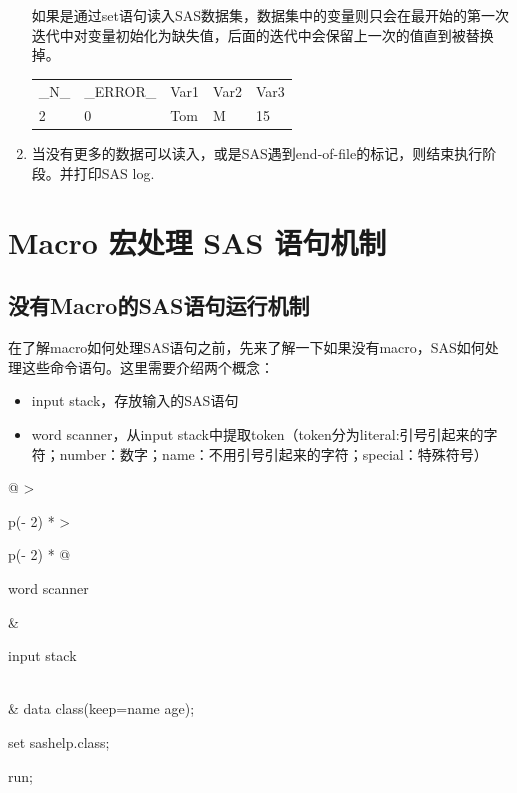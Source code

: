 \documentclass[
  letterpaper,
  DIV=11,
  numbers=noendperiod]{scrreprt}
\begin{document}
\begin{enumerate}
  如果是通过set语句读入SAS数据集，数据集中的变量则只会在最开始的第一次迭代中对变量初始化为缺失值，后面的迭代中会保留上一次的值直到被替换掉。

  \begin{longtable}[]{@{}lllll@{}}
  \toprule\noalign{}
  \endhead
  \bottomrule\noalign{}
  \endlastfoot
  \_N\_ & \_ERROR\_ & Var1 & Var2 & Var3 \\
  2 & 0 & Tom & M & 15 \\
  \end{longtable}
\item
  当没有更多的数据可以读入，或是SAS遇到end-of-file的标记，则结束执行阶段。并打印SAS
  log.
\end{enumerate}

\hypertarget{macro-ux5b8fux5904ux7406-sas-ux8bedux53e5ux673aux5236}{%
\chapter*{Macro 宏处理 SAS
语句机制}\label{macro-ux5b8fux5904ux7406-sas-ux8bedux53e5ux673aux5236}}


\hypertarget{ux6ca1ux6709macroux7684sasux8bedux53e5ux8fd0ux884cux673aux5236}{%
\section{没有Macro的SAS语句运行机制}\label{ux6ca1ux6709macroux7684sasux8bedux53e5ux8fd0ux884cux673aux5236}}

在了解macro如何处理SAS语句之前，先来了解一下如果没有macro，SAS如何处理这些命令语句。这里需要介绍两个概念：

\begin{itemize}
\item
  input stack，存放输入的SAS语句
\item
  word scanner，从input
  stack中提取token（token分为literal:引号引起来的字符；number：数字；name：不用引号引起来的字符；special：特殊符号）
\end{itemize}

\begin{longtable}[]{@{}
  >{\raggedright\arraybackslash}p{(\columnwidth - 2\tabcolsep) * }
  >{\raggedright\arraybackslash}p{(\columnwidth - 2\tabcolsep) * }@{}}
\toprule\noalign{}
\begin{minipage}[b]{\linewidth}\raggedright
word scanner
\end{minipage} & \begin{minipage}[b]{\linewidth}\raggedright
input stack
\end{minipage} \\
\midrule\noalign{}
\endhead
\bottomrule\noalign{}
\endlastfoot
& data class(keep=name age);

set sashelp.class;

run; \\
\end{longtable}
\end{document}
